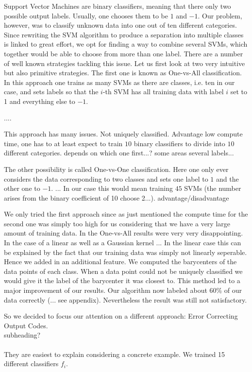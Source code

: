 Support Vector Machines are binary classifiers, meaning that there only two possible output labels. Usually, one chooses them to be $1$ and $-1$. Our problem, however, was to classify unknown data into one out of ten different categories. Since rewriting the SVM algorithm to produce a separation into multiple classes is linked to great effort, we opt for finding a way to combine several SVMs, which together would be able to choose from more than one label. There are a number of well known strategies tackling this issue. Let us first look at two very intuitive but also primitive strategies. The first one is known as One-vs-All classification. In this approach one trains as many SVMs as there are classes, i.e. ten in our case, and sets labels so that the $i$-th SVM has all training data with label $i$ set to 1 and everything else to $-1$. 

....

This approach has many issues. Not uniquely classified. Advantage low compute time, one has to at least expect to train $10$ binary classifiers to divide into $10$ different categories. depends on which one first...? some areas several labels...  

The other possibility is called One-vs-One classification. Here one only ever considers the data corresponding to two classes and sets one label to $1$ and the other one to $-1$. ... 
In our case this would mean training $45$ SVMs (the number arises from the binary coefficient of 10 choose 2...). advantage/disadvantage

We only tried the first approach since as just mentioned the compute time for the second one was simply too high for us considering that we have a very large amount of training data. In the One-vs-All results were very very disappointing. In the case of a linear as well as a Gaussian kernel ... In the linear case this can be explained by the fact that our training data was simply not linearly seperable. 
Hence we added in an additional feature. We computed the barycenters of the data points of each class. When a data point could not be uniquely classified we would give it the label of the barycenter it was closest to. This method led to a major improvement of our results. Our algorithm now labeled about 60\% of our data correctly (... see appendix).  Nevertheless the result was still not satisfactory. 

So we decided to focus our attention on a different approach: Error Correcting Output Codes. 
\\
subheading? \\
\\
They are easiest to explain considering a concrete example. We trained 15 different classifiers $f_i$. 

